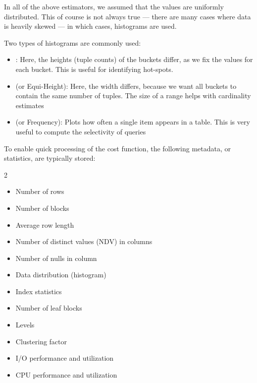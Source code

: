 In all of the above estimators, we assumed that the values are uniformly distributed.
This of course is not always true --- there are many cases where data is heavily skewed --- in which cases, histograms are used.

Two types of histograms are commonly used:
\begin{itemize}
    \item {}: Here, the heights (tuple counts) of the buckets differ, as we fix the values for each bucket.
          This is useful for identifying hot-spots.
    \item {} (or Equi-Height): Here, the width differs, because we want all buckets to contain the same number of tuples.
          The size of a range helps with cardinality estimates
    \item {} (or Frequency): Plots how often a single item appears in a table.
          This is very useful to compute the selectivity of queries
\end{itemize}

\newpage
To enable quick processing of the cost function, the following metadata, or statistics, are typically stored:
\begin{multicols}{2}
    \begin{itemize}
        \item Number of rows
        \item Number of blocks
        \item Average row length
    \end{itemize}
    \begin{itemize}
        \item Number of distinct values (NDV) in columns
        \item Number of nulls in column
        \item Data distribution (histogram)
    \end{itemize}
    \begin{itemize}
        \item Index statistics
        \item Number of leaf blocks
        \item Levels
        \item Clustering factor
    \end{itemize}
    \begin{itemize}
        \item I/O performance and utilization
        \item CPU performance and utilization
    \end{itemize}
\end{multicols}
